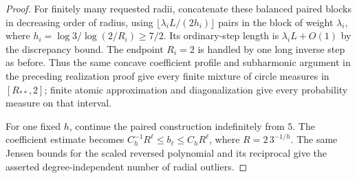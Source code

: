 \documentclass[11pt,a4paper]{article}
\theoremstyle{definition}
\theoremstyle{remark}
\numberwithin{equation}{section}
\begin{document}
\begin{proof}
For finitely many requested radii, concatenate these balanced paired
blocks in decreasing order of radius, using
$\lfloor\lambda_i L/(2h_i)\rfloor$ pairs in the block of weight
$\lambda_i$, where $h_i=\log3/\log(2/R_i)\ge7/2$.
Its ordinary-step length is $\lambda_iL+O(1)$ by the discrepancy bound.
The endpoint $R_i=2$ is handled by one long inverse step as before.
Thus the same concave coefficient profile and subharmonic argument in
the preceding realization proof give every finite mixture of circle
measures in $[R_{**},2]$; finite atomic approximation and diagonalization
give every probability measure on that interval.

For one fixed $h$, continue the paired construction indefinitely from
$5$.  The coefficient estimate becomes
$C_h^{-1}R^\ell\le b_\ell\le C_hR^\ell$, where
$R=2\,3^{-1/h}$.  The same Jensen bounds for the scaled reversed
polynomial and its reciprocal give the asserted degree-independent
number of radial outliers.
\end{proof}
\clearpage
{}
\end{document}
